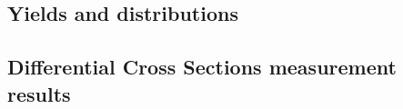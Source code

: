 %
% 
%
%
% 
\subsection{Yields and distributions}

\clearpage 

\subsection{Differential Cross Sections measurement results }
\label{sec:diff_xsec}


